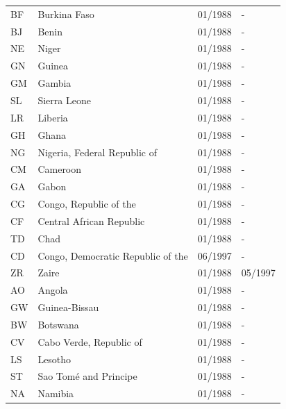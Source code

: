 \begin{small}
\begin{longtable}{p{0.5cm}p{9cm}p{2cm}p{2cm}}
BF	&	Burkina Faso	&	01/1988	&	-	\\

BJ	&	Benin	&	01/1988	&	-	\\

NE	&	Niger	&	01/1988	&	-	\\

GN	&	Guinea	&	01/1988	&	-	\\

GM	&	Gambia	&	01/1988	&	-	\\

SL	&	Sierra Leone	&	01/1988	&	-	\\

LR	&	Liberia	&	01/1988	&	-	\\

GH	&	Ghana	&	01/1988	&	-	\\

NG	&	Nigeria, Federal Republic of	&	01/1988	&	-	\\

CM	&	Cameroon	&	01/1988	&	-	\\

GA	&	Gabon	&	01/1988	&	-	\\

CG	&	Congo, Republic of the	&	01/1988	&	-	\\

CF	&	Central African Republic	&	01/1988	&	-	\\

TD	&	Chad	&	01/1988	&	-	\\

CD	&	Congo, Democratic Republic of the	&	06/1997	&	-	\\

ZR	&	Zaire	&	01/1988	&	05/1997	\\

AO	&	Angola	&	01/1988	&	-	\\

GW	&	Guinea-Bissau	&	01/1988	&	-	\\

BW	&	Botswana	&	01/1988	&	-	\\

CV	&	Cabo Verde, Republic of	&	01/1988	&	-	\\

LS	&	Lesotho	&	01/1988	&	-	\\

ST	&	Sao Tomé and Principe	&	01/1988	&	-	\\

NA	&	Namibia	&	01/1988	&	-	\\


\end{longtable}
\end{small}
